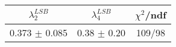 \begin{tabular}{c|c||c}
$\lambda_{2}^{LSB}$ & $\lambda_4^{LSB}$ & $\chi^{2}$/ndf \\
\hline
0.373 $\pm$ 0.085 & 0.38 $\pm$ 0.20 & 109/98\\
\end{tabular}
